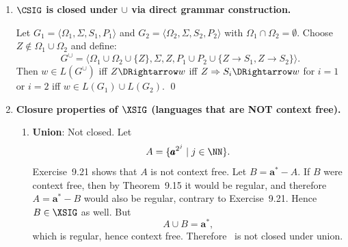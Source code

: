 \begin{enumerate}[{9.}1. ]
\begin{enumerate}
\item Because the chosen child always contains at least half of the
distinguished positions of its parent, a node that is $k$ levels above the end
of the path still has at least $2^k$ distinguished positions in its subtree.
Now choose the \emph{highest} node $N$ on the path whose subtree contains no
more than $n$ distinguished positions.  Such a node exists because the final
leaf contains exactly one distinguished position.  Its parent (if any) contains
more than $n$ distinguished positions, so $N$ must still contain more than
$n/2 = 2^{|\Omega|}$ distinguished positions.  Hence the portion of the path
inside the subtree rooted at $N$ still has more than $|\Omega|$ interior nodes,
and some nonterminal label must repeat there.  Let the higher and lower
occurrences of that repeated label be $R$.

If the higher $R$ derives $vRx$, and the lower $R$ derives $w$, then
\[
S\DRightarrow uRy \DRightarrow uvRxy \DRightarrow uvwxy.
\]
The subtree rooted at the lower $R$ contains a distinguished position, so $w$
contains one.  The higher $R$ lies inside the subtree rooted at $N$, so $vwx$
contains no more than $n$ distinguished positions.  And since the two
occurrences of $R$ are distinct, at least one distinguished position lies in
the part of the higher subtree outside the lower one, so $vx$ contains a
distinguished position.  Replacing the lower $R$-subtree
by repeated copies of the higher one now gives the pumped strings
$uv^iwx^iy$, exactly as required in Theorem~9.9. \qed
\end{enumerate}

\item \textbf{$\CSIG$ is closed under $\cup$ via direct grammar construction.}

Let $G_1 = \langle\Omega_1,\Sigma,S_1,P_1\rangle$ and $G_2 = \langle\Omega_2,\Sigma,S_2,P_2\rangle$ with $\Omega_1\cap\Omega_2=\emptyset$. Choose $Z \notin \Omega_1\cup\Omega_2$ and define:
\[
G^\cup = \langle\Omega_1\cup\Omega_2\cup\{Z\},\Sigma,Z,P_1\cup P_2\cup\{Z\to S_1,Z\to S_2\}\rangle.
\]
Then $w \in L(G^\cup)$ iff $Z \DRightarrow w$ iff $Z \Rightarrow S_i \DRightarrow w$ for $i=1$ or $i=2$ iff $w \in L(G_1)\cup L(G_2)$. \qed

\item \textbf{Closure properties of $\XSIG$ (languages that are NOT context free).}

\begin{enumerate}
\item \textbf{Union}: Not closed.  Let
\[
A=\{\pmb{a}^{2^j}\mid j\in\NN\}.
\]
Exercise~9.21 shows that $A$ is not context free.  Let
$B=\pmb{a}^*-A$.  If $B$ were context free, then by Theorem~9.15 it would be
regular, and therefore $A=\pmb{a}^*-B$ would also be regular, contrary to
Exercise~9.21.  Hence $B\in\XSIG$ as well.  But
\[
A\cup B=\pmb{a}^*,
\]
which is regular, hence context free.  Therefore \XSIG\ is not closed under
union.


\end{enumerate}
\end{enumerate}
